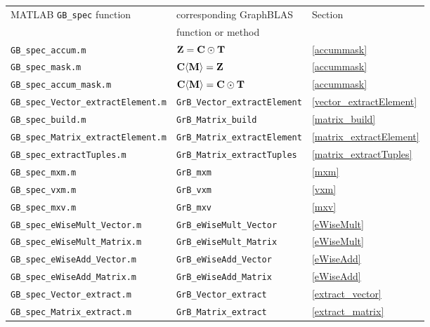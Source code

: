 \documentclass[12pt]{article}
\begin{document}
\vspace{0.2in}
{\footnotesize
\begin{tabular}{lll}
MATLAB \verb'GB_spec' function          & corresponding GraphBLAS           & Section \\
                                        & function or  method               & \\
\hline
\verb'GB_spec_accum.m'                  & ${\bf Z = C \odot T}$                     & \ref{accummask} \\
\verb'GB_spec_mask.m'                   & ${\bf C \langle M \rangle = Z}$           & \ref{accummask} \\
\verb'GB_spec_accum_mask.m'             & ${\bf C \langle M \rangle = C \odot T}$   & \ref{accummask} \\
\hline
\verb'GB_spec_Vector_extractElement.m'  & \verb'GrB_Vector_extractElement'  & \ref{vector_extractElement} \\
\hline
\verb'GB_spec_build.m'                  & \verb'GrB_Matrix_build'           & \ref{matrix_build} \\
\verb'GB_spec_Matrix_extractElement.m'  & \verb'GrB_Matrix_extractElement'  & \ref{matrix_extractElement} \\
\verb'GB_spec_extractTuples.m'          & \verb'GrB_Matrix_extractTuples'   & \ref{matrix_extractTuples} \\
\hline
\verb'GB_spec_mxm.m'                    & \verb'GrB_mxm'                    & \ref{mxm} \\
\verb'GB_spec_vxm.m'                    & \verb'GrB_vxm'                    & \ref{vxm} \\
\verb'GB_spec_mxv.m'                    & \verb'GrB_mxv'                    & \ref{mxv} \\
\hline
\verb'GB_spec_eWiseMult_Vector.m'       & \verb'GrB_eWiseMult_Vector'       & \ref{eWiseMult} \\
\verb'GB_spec_eWiseMult_Matrix.m'       & \verb'GrB_eWiseMult_Matrix'       & \ref{eWiseMult} \\
\verb'GB_spec_eWiseAdd_Vector.m'        & \verb'GrB_eWiseAdd_Vector'        & \ref{eWiseAdd} \\
\verb'GB_spec_eWiseAdd_Matrix.m'        & \verb'GrB_eWiseAdd_Matrix'        & \ref{eWiseAdd} \\
\hline
\verb'GB_spec_Vector_extract.m'         & \verb'GrB_Vector_extract'         & \ref{extract_vector} \\
\verb'GB_spec_Matrix_extract.m'         & \verb'GrB_Matrix_extract'         & \ref{extract_matrix} \\

\end{tabular}}
\end{document}
